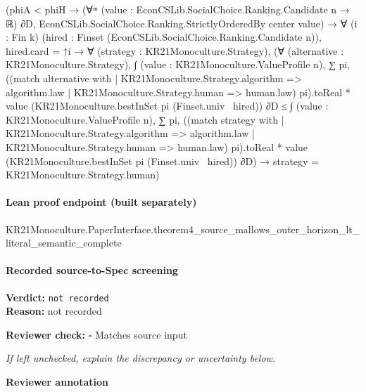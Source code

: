 \documentclass[10pt]{article}
\newcommand{\reviewerbox}{%
  \par\noindent\fbox{\parbox{0.96\linewidth}{\rule{0pt}{0.38in}}}\par
}
\newcommand{\reviewmatch}[1]{%
  \par\noindent\textbf{Reviewer check:} $\square$\; #1\par
  \noindent\emph{If left unchecked, explain the discrepancy or uncertainty below.}\par
}
\begin{document}
\begin{ReviewVerbatim}
                        (phiA < phiH →
                          (∀ᵐ (value : EconCSLib.SocialChoice.Ranking.Candidate n → ℝ) ∂D,
                              EconCSLib.SocialChoice.Ranking.StrictlyOrderedBy center value) →
                            ∀ (i : Fin k) (hired : Finset (EconCSLib.SocialChoice.Ranking.Candidate n)),
                              hired.card = ↑i →
                                ∀ (strategy : KR21Monoculture.Strategy),
                                  (∀ (alternative : KR21Monoculture.Strategy),
                                      ∫ (value : KR21Monoculture.ValueProfile n),
                                          ∑ pi,
                                            ((match alternative with
                                                  | KR21Monoculture.Strategy.algorithm => algorithm.law
                                                  | KR21Monoculture.Strategy.human => human.law)
                                                  pi).toReal *
                                              value (KR21Monoculture.bestInSet pi (Finset.univ \ hired)) ∂D ≤
                                        ∫ (value : KR21Monoculture.ValueProfile n),
                                          ∑ pi,
                                            ((match strategy with
                                                  | KR21Monoculture.Strategy.algorithm => algorithm.law
                                                  | KR21Monoculture.Strategy.human => human.law)
                                                  pi).toReal *
                                              value (KR21Monoculture.bestInSet pi (Finset.univ \ hired)) ∂D) →
                                    strategy = KR21Monoculture.Strategy.human)
\end{ReviewVerbatim}

\paragraph{Lean proof endpoint (built separately)}\begin{ReviewVerbatim}
KR21Monoculture.PaperInterface.theorem4_source_mallows_outer_horizon_lt_literal_semantic_complete
\end{ReviewVerbatim}

\paragraph{Recorded source-to-Spec screening}
\textbf{Verdict:} \texttt{not recorded}
\\
\textbf{Reason:} not recorded
\reviewmatch{Matches source input}
\noindent\textbf{Reviewer annotation}\par
\reviewerbox
\clearpage
\hypertarget{source-claim-54f72d882fb14d8c}{}
\end{document}
